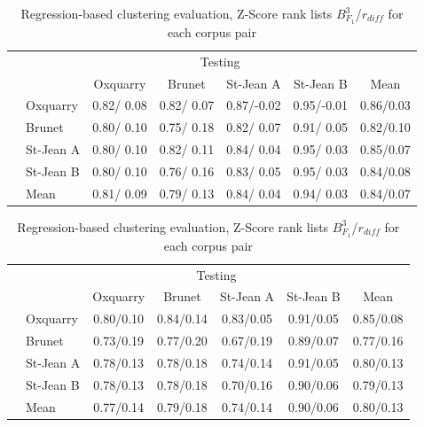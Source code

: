 \begin{table}[H]
  \centering
  \caption{Regression-based clustering evaluation, Z-Score rank lists $B^{3}_{F_1}$/$r_{diff}$ for each corpus pair}
  \label{tab:regression-based_clustering_zscore}

  \vspace{0.5cm}

  \begin{tabular}{l l| c c c c|c}
    \toprule
    \multicolumn{2}{c}{\multirow{2}{*}{}} & \multicolumn{4}{c}{Testing} \\
    \multicolumn{2}{c}{} & Oxquarry & Brunet & St-Jean A & St-Jean B & Mean \\
    \midrule
    \parbox[t]{2mm}{}
    & Oxquarry  & 0.82/ 0.08 & 0.82/ 0.07 & 0.87/-0.02 & 0.95/-0.01 & 0.86/0.03\\
    & Brunet    & 0.80/ 0.10 & 0.75/ 0.18 & 0.82/ 0.07 & 0.91/ 0.05 & 0.82/0.10\\
    & St-Jean A & 0.80/ 0.10 & 0.82/ 0.11 & 0.84/ 0.04 & 0.95/ 0.03 & 0.85/0.07\\
    & St-Jean B & 0.80/ 0.10 & 0.76/ 0.16 & 0.83/ 0.05 & 0.95/ 0.03 & 0.84/0.08\\
    \midrule
    & Mean      & 0.81/ 0.09 & 0.79/ 0.13 & 0.84/ 0.04 & 0.94/ 0.03 & 0.84/0.07\\
    \bottomrule
  \end{tabular}

  \vspace{0.5cm}

  \begin{tabular}{l l| c c c c|c}
    \toprule
    \multicolumn{2}{c}{\multirow{2}{*}{}} & \multicolumn{4}{c}{Testing} \\
    \multicolumn{2}{c}{} & Oxquarry & Brunet & St-Jean A & St-Jean B & Mean \\
    \midrule
    \parbox[t]{2mm}{}
    & Oxquarry  & 0.80/0.10 & 0.84/0.14 & 0.83/0.05 & 0.91/0.05 & 0.85/0.08 \\
    & Brunet    & 0.73/0.19 & 0.77/0.20 & 0.67/0.19 & 0.89/0.07 & 0.77/0.16 \\
    & St-Jean A & 0.78/0.13 & 0.78/0.18 & 0.74/0.14 & 0.91/0.05 & 0.80/0.13 \\
    & St-Jean B & 0.78/0.13 & 0.78/0.18 & 0.70/0.16 & 0.90/0.06 & 0.79/0.13 \\
    \midrule
    & Mean      & 0.77/0.14 & 0.79/0.18 & 0.74/0.14 & 0.90/0.06 & 0.80/0.13 \\
    \bottomrule
  \end{tabular}

\end{table}
